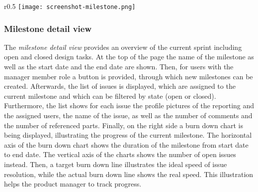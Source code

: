 \begin{wrapfigure}{r}{0.5\textwidth}
    \centering
    \texttt{[image: screenshot-milestone.png]}
    \label{fig:screenshot-milestone}
\end{wrapfigure}

\subsubsection{Milestone detail view}

The \textit{milestone detail view} provides an overview of the current sprint including open and closed design tasks.
At the top of the page the name of the milestone as well as the start date and the end date are shown.
Then, for users with the manager member role a button is provided, through which new milestones can be created.
Afterwards, the list of issues is displayed, which are assigned to the current milestone and which can be filtered by state (open or closed).
Furthermore, the list shows for each issue the profile pictures of the reporting and the assigned users, the name of the issue, as well as the number of comments and the number of referenced parts.
Finally, on the right side a burn down chart is being displayed, illustrating the progress of the current milestone.
The horizontal axis of the burn down chart shows the duration of the milestone from start date to end date.
The vertical axis of the charts shows the number of open issues instead.
Then, a target burn down line illustrates the ideal speed of issue resolution, while the actual burn down line shows the real speed.
This illustration helps the product manager to track progress.